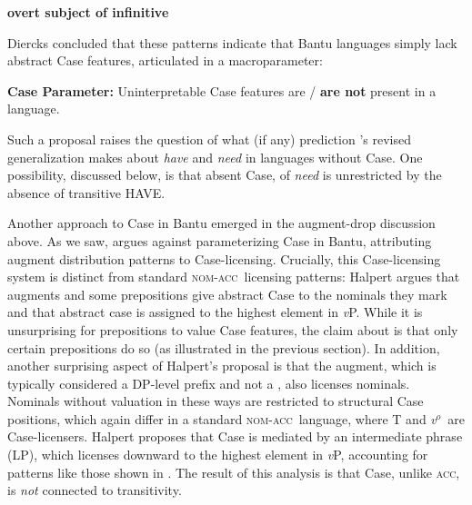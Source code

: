 \documentclass[output=paper,
modfonts
]{langscibook}
\begin{document}
\begin{exe} 
\ex \label{PossibleConstruction} \textbf{ overt subject of infinitive}
\end{exe}

\largerpage
Diercks concluded that these patterns indicate that Bantu languages
simply lack abstract Case features, articulated in a macroparameter:

\begin{exe} 
\ex\textbf{Case Parameter:} Uninterpretable Case features are / \textbf{are not} 
  present in a language. 
\end{exe}

Such a proposal raises the question %
of what (if any) prediction 
\citet{Harves:2012}'s revised generalization makes about {\it have} and {\it need} in
languages without Case.  One possibility, discussed below, is that absent Case,  of {\it need} is unrestricted by the  absence of transitive HAVE.

Another approach to Case in Bantu emerged in the augment-drop discussion above.  As we saw,  
\citet{Halpert:2012} argues against parameterizing Case in Bantu,
attributing augment distribution patterns to Case-licensing.  Crucially, this Case-licensing system is distinct from
standard \textsc{nom}-\textsc{acc}\ licensing patterns: Halpert argues that augments and some
prepositions give abstract Case to the nominals they mark and that abstract case is assigned to the highest element in {\it v}P. While it is
unsurprising for prepositions to value Case features, the claim about  is that only certain prepositions do so (as illustrated in the previous section).  In addition, another surprising aspect of Halpert's proposal is that the augment, which is typically considered a DP-level prefix and not a , also licenses nominals.  Nominals without valuation in these ways are restricted to
structural Case positions, which again differ in a standard \textsc{nom}-\textsc{acc}\ language, where T
and {\it v$^o$}\ are Case-licensers. Halpert proposes that Case is
mediated by an  intermediate phrase (LP), which licenses downward to
the highest element in {\it v}P, accounting for patterns like those shown
in .  The result of this analysis is that
 Case, unlike \textsc{acc}, is {\it not} connected to transitivity.
\end{document}
